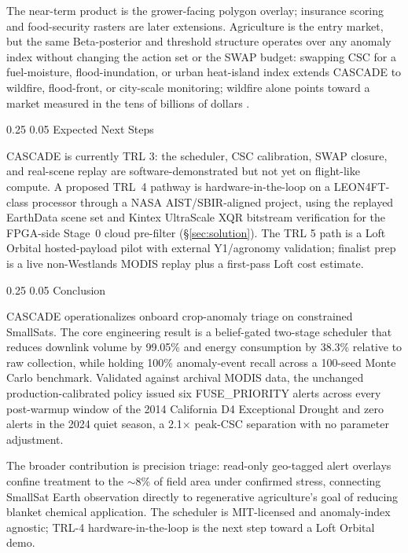 \documentclass[11pt,letterpaper]{article}
\makeatletter
\renewcommand\section{\@startsection{section}{1}{\z@}
  {0.25\baselineskip}
  {0.05\baselineskip}
  {\normalfont\large\bfseries}}
\makeatother
\begin{document}
The near-term product is the grower-facing polygon overlay; insurance scoring and food-security rasters are later extensions. Agriculture is the entry market, but the same Beta-posterior and threshold structure operates over any anomaly index without changing the action set or the SWAP budget: swapping CSC for a fuel-moisture, flood-inundation, or urban heat-island index extends CASCADE to wildfire, flood-front, or city-scale monitoring; wildfire alone points toward a market measured in the tens of billions of dollars \cite{fire-detection-market}.

\section{Expected Next Steps}
\label{sec:next}

CASCADE is currently TRL 3: the scheduler, CSC calibration, SWAP closure, and real-scene replay are software-demonstrated but not yet on flight-like compute. A proposed TRL~4 pathway is hardware-in-the-loop on a LEON4FT-class processor through a NASA AIST/SBIR-aligned project, using the replayed EarthData scene set and Kintex UltraScale XQR bitstream verification for the FPGA-side Stage~0 cloud pre-filter (\S\ref{sec:solution}). The TRL 5 path is a Loft Orbital hosted-payload pilot with external Y1/agronomy validation; finalist prep is a live non-Westlands MODIS replay plus a first-pass Loft cost estimate.


\section{Conclusion}

\label{chapter:conclusion}

CASCADE operationalizes onboard crop-anomaly triage on constrained SmallSats. The core engineering result is a belief-gated two-stage scheduler that reduces downlink volume by 99.05\% and energy consumption by 38.3\% relative to raw collection, while holding 100\% anomaly-event recall across a 100-seed Monte Carlo benchmark. Validated against archival MODIS data, the unchanged production-calibrated policy issued six FUSE\_PRIORITY alerts across every post-warmup window of the 2014 California D4 Exceptional Drought and zero alerts in the 2024 quiet season, a 2.1$\times$ peak-CSC separation with no parameter adjustment.

The broader contribution is precision triage: read-only geo-tagged alert overlays confine treatment to the $\sim$8\% of field area under confirmed stress, connecting SmallSat Earth observation directly to regenerative agriculture's goal of reducing blanket chemical application. The scheduler is MIT-licensed and anomaly-index agnostic; TRL-4 hardware-in-the-loop is the next step toward a Loft Orbital demo.

\newpage
\begingroup
\footnotesize


\endgroup
\end{document}
